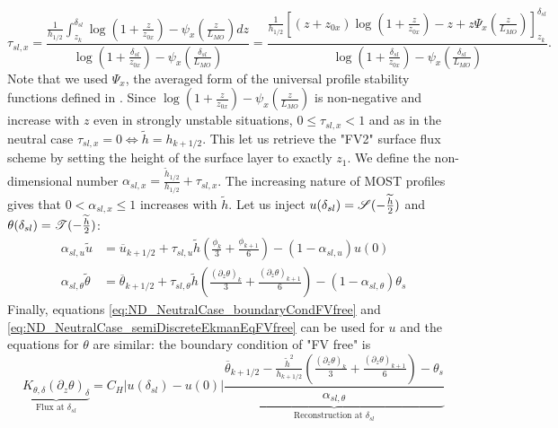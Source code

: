 \begin{equation}
\tau_{sl, x} = \frac{\frac{1}{{h_{1/2}}}\int_{z_k}^{\delta_{sl}} \log(1+\frac{z}{z_{0x}})- \psi_x(\frac{z}{L_{MO}})
	dz}{\log(1+\frac{\delta_{sl}}{z_{0x}})- \psi_x(\frac{\delta_{sl}}{L_{MO}})
    }
    =
 \frac{\frac{1}{{h_{1/2}}}
    \left[
	    (z+z_{0x})\log(1+\frac{z}{z_{0x}})-z
    +
    z \Psi_x(\frac{z}{L_{MO}}) \right]_{z_k}^{\delta_{sl}}
    }{\log(1+\frac{\delta_{sl}}{z_{0x}})- \psi_x(\frac{\delta_{sl}}{L_{MO}})
    }.
\end{equation}
Note that we used $\Psi_x$, the averaged form of the universal
profile stability functions defined in \citep{nishizawa_surface_2018}.
%
Since $\log(1+\frac{z}{z_{0x}})-
\psi_x(\frac{z}{L_{MO}})$ is non-negative and increase with $z$ even
in strongly unstable situations,
$0 \leq \tau_{sl, x} < 1$ and as in the neutral case
$\tau_{sl, x}=0 \iff \widetilde{h}=h_{k+1/2}$. This let us retrieve
the "FV2" surface flux scheme by setting the height of the surface
layer to exactly $z_1$.
We define the non-dimensional number
$\alpha_{sl, x} = \frac{\widetilde{h}_{1/2}}{h_{1/2}} + \tau_{sl, x}$.
The increasing nature of MOST profiles gives that
$0 < \alpha_{sl, x} \leq 1$ increases with $\widetilde{h}$.
Let us inject $u(\delta_{sl}) =
{\cal S}(-\frac{\widetilde{h}}{2})$ and
$\theta(\delta_{sl}) = {\cal T}(-\frac{\widetilde{h}}{2})$:
\begin{equation}
\begin{aligned}
\label{eq:ND_StratifiedCase_relation_tilde_bar}
	\alpha_{sl, u}\widetilde{u} &= \overline{u}_{k+1/2} +
	\tau_{sl, u}
\widetilde{h}
	(\frac{\phi_k}{3} + \frac{\phi_{k+1}}{6})
	- (1- \alpha_{sl, u}) u(0)\\
\alpha_{sl, \theta}
\widetilde{\theta}
	&= \overline{\theta}_{k+1/2} + \tau_{sl, \theta}
	\widetilde{h}(\frac{{(\partial_z \theta)}_k}{3} + \frac{{(\partial_z \theta)}_{k+1}}{6})
 - (1 - \alpha_{sl, \theta})\theta_s
\end{aligned}
\end{equation}
Finally, equations \eqref{eq:ND_NeutralCase_boundaryCondFVfree} and
\eqref{eq:ND_NeutralCase_semiDiscreteEkmanEqFVfree} can be used for
$u$ and the equations for $\theta$ are similar:
the boundary condition of "FV free" is
\begin{equation}
	\label{eq:ND_StratifiedCase_semiDiscreteEkmanEqFVfree}
	\underbrace{K_{\theta, \delta} (\partial_z \theta)_\delta}_{
		\text{Flux at } \delta_{sl}
	} = 
	C_H |u(\delta_{sl})-u(0)|
	\underbrace{
	\frac{
  \overline{\theta}_{k+1/2} - \frac{\widetilde{h}^2}{h_{k+1/2}}
	(\frac{{(\partial_z \theta)}_k}{3} +
	\frac{{(\partial_z \theta)}_{k+1}}{6}) 
  - \theta_s
}{\alpha_{sl, \theta}}
	}_{\text{Reconstruction at } \delta_{sl}}
\end{equation}

